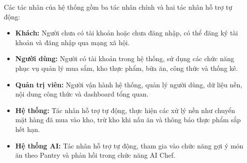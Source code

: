 Các tác nhân của hệ thống gồm ba tác nhân chính và hai tác nhân hỗ trợ tự động:
\begin{itemize}
    \item \textbf{Khách:} Người chưa có tài khoản hoặc chưa đăng nhập, có thể đăng ký tài khoản và đăng nhập qua mạng xã hội.
    \item \textbf{Người dùng:} Người có tài khoản trong hệ thống, sử dụng các chức năng phục vụ quản lý mua sắm, kho thực phẩm, bữa ăn, công thức và thống kê.
    \item \textbf{Quản trị viên:} Người vận hành hệ thống, quản lý người dùng, dữ liệu nền, nội dung công thức và dashboard tổng quan.
    \item \textbf{Hệ thống:} Tác nhân hỗ trợ tự động, thực hiện các xử lý nền như chuyển mặt hàng đã mua vào kho, trừ kho khi nấu ăn và thông báo thực phẩm sắp hết hạn.
    \item \textbf{Hệ thống AI:} Tác nhân hỗ trợ tự động, tham gia vào chức năng gợi ý món ăn theo Pantry và phản hồi trong chức năng AI Chef.
\end{itemize}

